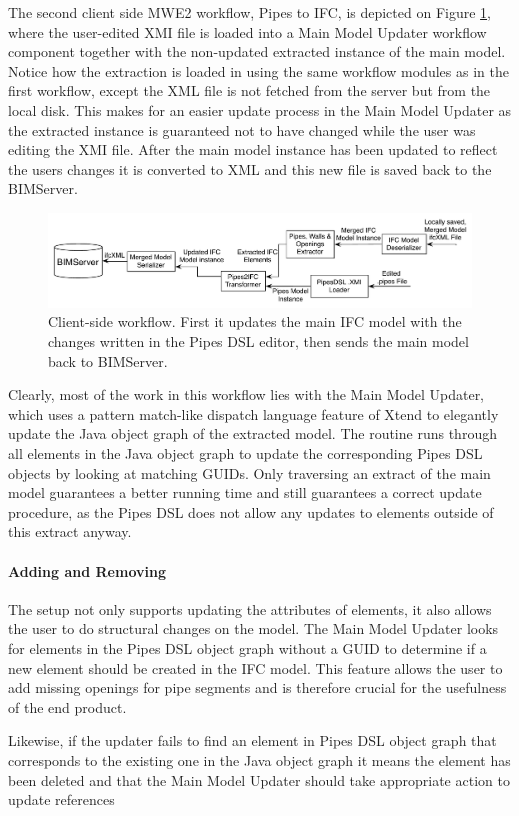 The second client side MWE2 workflow, Pipes to IFC, is depicted on Figure \ref{fig:Pipes2IFCWorkflow}, where the user-edited XMI file is loaded into a Main Model Updater workflow component together with the non-updated extracted instance of the main model. Notice how the extraction is loaded in using the same workflow modules as in the first workflow, except the XML file is not fetched from the server but from the local disk. This makes for an easier update process in the Main Model Updater as the extracted instance is guaranteed not to have changed while the user was editing the XMI file. After the main model instance has been updated to reflect the users changes it is converted to XML and this new file is saved back to the BIMServer.

\begin{figure}[t]
    \centering
        \includegraphics[width=120mm]{images/Pipes2IFC.pdf}
    \caption{Client-side workflow. First it updates the main IFC model with the changes written in the Pipes DSL editor, then sends the main model back to BIMServer.}
    \label{fig:Pipes2IFCWorkflow}
\end{figure}

Clearly, most of the work in this workflow lies with the Main Model Updater, which uses a pattern match-like dispatch language feature of Xtend to elegantly update the Java object graph of the extracted model. The routine runs through all elements in the Java object graph to update the corresponding Pipes DSL objects by looking at matching GUIDs. Only traversing an extract of the main model guarantees a better running time and still guarantees a correct update procedure, as the Pipes DSL does not allow any updates to elements outside of this extract anyway.

\paragraph{Adding and Removing} The setup not only supports updating the attributes of elements, it also allows the user to do structural changes on the model. The Main Model Updater looks for elements in the Pipes DSL object graph without a GUID to determine if a new element should be created in the IFC model. This feature allows the user to add missing openings for pipe segments and is therefore crucial for the usefulness of the end product.

Likewise, if the updater fails to find an element in Pipes DSL object graph that corresponds to the existing one in the Java object graph it means the element has been deleted and that the Main Model Updater should take appropriate action to update references

